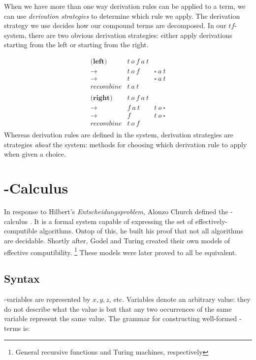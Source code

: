 When we have more than one way derivation rules can be applied to a term,
we can use \emph{derivation strategies} to determine which rule we apply.
The derivation strategy we use decides how our compound terms are decomposed.
In our $tf$-system, there are two obvious derivation strategies:
either apply derivations starting from the left or starting from the right.

\[
\begin{array}{rcl}
  
  \textbf{(left)} & t\ o\ f\ a\ t \\
  \to                & t\ o\ f & \square\ a\ t \\
  \to                & t       & \square\ a\ t \\
  \textit{recombine} & t\ a\ t & \\
  \\
  \textbf{(right)}   & t\ o\ f\ a\ t \\
  \to                & f\ a\ t & t\ o\ \square \\
  \to                & f       & t\ o\ \square \\
  \textit{recombine} & t\ o\ f & \\
  
\end{array}
\]
Whereas derivation rules are defined in the system, 
derivation strategies are strategies \emph{about} the system: methods for choosing which derivation rule to apply when given a choice. 

\section{\lam-Calculus}

In response to Hilbert's \emph{Entscheidungsproblem}, Alonzo Church defined the \lam-calculus \cite{ChurchEnt36}. 
It is a formal system capable of expressing the set of effectively-computible algorithms. 
Ontop of this, he built his proof that not all algorithms are decidable. 
Shortly after, Godel and Turing created their own models of effective computibility.
\footnote{General recursive functions and Turing machines, respectively} 
These models were later proved to all be equivalent.

\subsection{Syntax}
  
  \lam-variables are represented by $x,y,z$, etc. Variables denote an arbitrary value: 
  they do not describe what the value is but that any two occurrences of the same variable represent the same value. 
  The grammar for constructing well-formed \lam-terms is:

